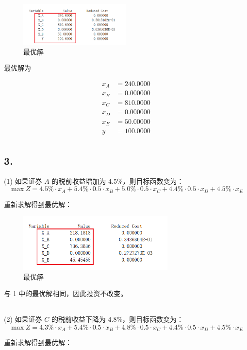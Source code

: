 \documentclass{article}
\begin{document}
\begin{figure}[H]
\centering
\includegraphics[width=0.5\textwidth]{img/4.png}
\caption{最优解}
\end{figure}

最优解为

\[
\begin{aligned}
    x_A &= 240.0000  \\
    x_B &= 0.000000 \\
    x_C &= 810.0000 \\
    x_D &= 0.000000 \\
    x_E &= 50.00000 \\
      y &= 100.0000 \\
\end{aligned}
\]

\subsection*{3.}
(1) 如果证券 \(A\) 的税前收益增加为 4.5\%，则目标函数变为：
\[
\max Z = 4.5\% \cdot x_A + 5.4\% \cdot 0.5 \cdot x_B + 5.0\% \cdot 0.5 \cdot x_C + 4.4\% \cdot 0.5 \cdot x_D + 4.5\% \cdot x_E
\]

重新求解得到最优解：

\begin{figure}[H]
\centering
\includegraphics[width=0.7\textwidth]{img/5.png}
\caption{最优解}
\end{figure}

与 1 中的最优解相同，因此投资不改变。

~\\

(2) 如果证券 \(C\) 的税前收益下降为 4.8\%，则目标函数变为：
\[
\max Z = 4.3\% \cdot x_A + 5.4\% \cdot 0.5 \cdot x_B + 4.8\% \cdot 0.5 \cdot x_C + 4.4\% \cdot 0.5 \cdot x_D + 4.5\% \cdot x_E
\]

重新求解得到最优解：
\end{document}
